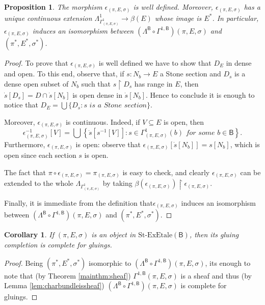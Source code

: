 \documentclass[11pt]{amsart}
\newcommand{\stexetale}{\textrm{St-ExEtale}}
\theoremstyle{plain}
\newtheorem{proposition}[theorem]{Proposition}
\newtheorem{corollary}[theorem]{Corollary}
\theoremstyle{definition}
\theoremstyle{plain}
\theoremstyle{remark}
\newcommand{\bool}[1]{\mathsf{#1}}
\newcommand{\bp}[1]{\left\lbrace #1 \right\rbrace}
\newcommand{\0}{\mathsf{0}}
\renewcommand{\1}{\mathsf{1}}
\renewcommand{\2}{\mathsf{2}}
\theoremstyle{definition}
\begin{document}
\begin{proposition}\label{fact:imepsglucomp}
The morphism $\epsilon_{(\pi, E, \sigma)}$ is well defined. 
Moreover, $\epsilon_{(\pi, E, \sigma)}$ has a unique continuous extension $\Lambda^1_{\Gamma^1_{(\pi, E, \sigma)}}\to\beta(E)$ whose image is $E^*$. In particular, $\epsilon_{(\pi, E, \sigma)}$ induces an isomorphism between $(\Lambda^{\bool{B}}\circ\Gamma^{1,\bool{B}})(\pi, E, \sigma)$ and $(\pi^*,E^*,\sigma^*)$.
\end{proposition}
\begin{proof}
To prove that $\epsilon_{(\pi, E, \sigma)}$ is well defined we have to show that $D_E$ in dense and open.
To this end, observe that, if $s:N_b\to E$ a Stone section and $D_s$ is a dense open subset of $N_b$ such that $s\restriction D_s$ has range in $E$, then $\dot{s}[D_s]=D\cap \dot{s}[N_b]$ is open dense in $\dot{s}[N_b]$. Hence to conclude it is enough to notice that $D_E=\bigcup\{D_s: s\textit{ is a Stone section}\}$.

Moreover, $\epsilon_{(\pi, E, \sigma)}$ is continuous. Indeed, if $V\subseteq E$ is open, then 
\[
\epsilon_{(\pi, E, \sigma)}^{-1}[V]=\bigcup\bp{\dot{s}[s^{-1}[V]]: s\in\Gamma^1_{(\pi, E, \sigma)}(b)\textit{ for some }b\in\bool{B}}.
\] 
Furthermore, $\epsilon_{(\pi, E, \sigma)}$ is open: observe that $\epsilon_{(\pi, E, \sigma)}[\dot{s}[N_b]]=s[N_b]$, which is open since each section $s$ is open. 

The fact that $\pi\circ\epsilon_{(\pi, E, \sigma)}=\pi_{(\pi, E, \sigma)}$ is easy to check, and clearly $\epsilon_{(\pi, E, \sigma)}$ can be extended to the whole $\Lambda_{\Gamma^1_{(\pi, E, \sigma)}}$ by taking $\beta(\epsilon_{(\pi, E, \sigma)})\restriction \epsilon_{(\pi, E, \sigma)}$.

Finally, it is immediate from the definition that$\epsilon_{(\pi, E, \sigma)}$ induces an isomorphism between $(\Lambda^{\bool{B}}\circ\Gamma^{1,\bool{B}})(\pi, E, \sigma)$ and $(\pi^*,E^*,\sigma^*)$.
\end{proof}
\begin{corollary}
If $(\pi, E, \sigma)$ is an object in $\stexetale(\bool{B})$, then its gluing completion is complete for gluings.
\end{corollary}
\begin{proof}
Being $(\pi^*, E^*, \sigma^*)$ isomorphic to $(\Lambda^{\bool{B}}\circ\Gamma^{1,\bool{B}})(\pi, E, \sigma)$, its enough to note that (by Theorem \ref{mainthm:sheaf}) $\Gamma^{1,\bool{B}}(\pi, E, \sigma)$ is a sheaf and thus (by Lemma \ref{lem:charbundleissheaf}) $(\Lambda^{\bool{B}}\circ\Gamma^{1,\bool{B}})(\pi, E, \sigma)$ is complete for gluings.
\end{proof}
\end{document}
